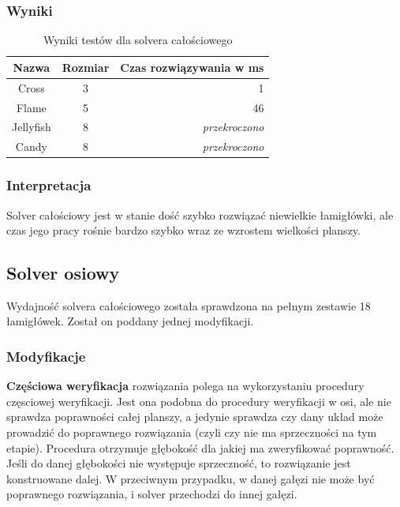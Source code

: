 \subsubsection{Wyniki}
\begin{table}[h!]
    \begin{center}
        \begin{tabular}{|c|c|r|}
            \hline
            Nazwa          & Rozmiar        & Czas rozwiązywania w ms \\
            \hline
            Cross       & 3 & 1                     \\
            Flame       & 5 & 46                    \\
            Jellyfish   & 8 & \textit{przekroczono} \\
            Candy       & 8 & \textit{przekroczono} \\
            \hline
        \end{tabular}
    \end{center}
    \caption{Wyniki testów dla solvera całościowego}
\end{table}

\subsubsection{Interpretacja}
    Solver całościowy jest w stanie dość szybko rozwiązać niewielkie łamigłówki,
ale czas jego pracy rośnie bardzo szybko wraz ze wzrostem wielkości planszy.


\subsection{Solver osiowy}
    Wydajność solvera całościowego została sprawdzona na pełnym zestawie 18 łamigłówek. Został
on poddany jednej modyfikacji.

\subsubsection{Modyfikacje}
    \textbf{Częściowa weryfikacja} rozwiązania polega na wykorzystaniu procedury częsciowej weryfikacji.
Jest ona podobna do procedury weryfikacji w osi, ale nie sprawdza poprawności całej planszy,
a jedynie sprawdza czy dany układ może prowadzić do poprawnego rozwiązania (czyli czy nie ma sprzeczności na tym etapie).
Procedura otrzymuje głębokość dla jakiej ma zweryfikować poprawność. Jeśli do danej głębokości nie
występuje sprzeczność, to rozwiązanie jest konstruowane dalej. W przeciwnym przypadku, w danej gałęzi
nie może być poprawnego rozwiązania, i solver przechodzi do innej gałęzi.

